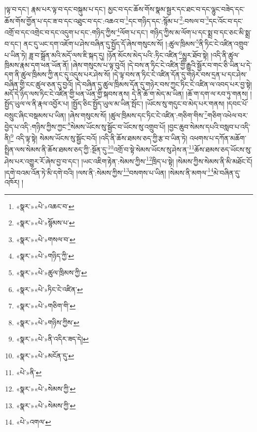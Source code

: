 །ལྟ་བ་དང་། རྣམ་པར་ལྟ་བ་དང་བསྐུམ་པ་དང་། མྱང་བ་དང་ཆོས་གོས་སྣམ་སྦྱར་དང་ཐང་བ་དང་ལྷུང་བཟེད་དང་ཆོས་གོས་གྱོན་པ་དང་ཟ་བ་དང་འཐུང་བ་དང་:འཆའ་བ་\footnote{«སྣར་»«པེ་»འཆང་བ་}དང་གཉིད་དང་:སྙོམ་པ་\footnote{«སྣར་»«པེ་»སྙོམས་པ་}:བསལ་བ་\footnote{«སྣར་»«པེ་»གསལ་བ་}དང་འོང་བ་དང་འགྲོ་བ་དང་འགྲེང་བ་དང་འདུག་པ་དང་:གཉིད་ཀྱིས་\footnote{«སྣར་»«པེ་»གཉིད་ཀྱི་}ལོག་པ་དང་། གཉིད་ཀྱིས་མ་ལོག་པ་དང་སྨྲ་བ་དང་ཅང་མི་སྨྲ་བ་དང་། ནང་དུ་ཡང་དག་འཇོག་པ་ཤེས་བཞིན་དུ་སྤྱོད་དོ་ཞེས་གསུངས་སོ། །:ཚུལ་ཁྲིམས་\footnote{«སྣར་»«པེ་»ཚུལ་ཁྲིམས་ཀྱི་}ནི་ཏིང་ངེ་འཛིན་འགྲུབ་པ་ཡིན་ཏེ། ཟླ་བ་སྒྲོན་མའི་མདོ་ལས་ཇི་སྐད་དུ། །ཉོན་མོངས་མེད་པའི་:ཏིང་འཛིན་\footnote{«སྣར་»«པེ་»ཏིང་ངེ་འཛིན་}མྱུར་ཐོབ་སྟེ། །འདི་ནི་ཚུལ་ཁྲིམས་རྣམ་དག་ཕན་ཡོན་ནོ། །ཞེས་གསུངས་པ་ལྟ་བུའོ། །དེ་བས་ན་ཏིང་ངེ་འཛིན་གྱི་རྒྱུའི་སྦྱོར་བ་གང་ཅི་ཡིན་པ་དེ་དག་ནི་ཚུལ་ཁྲིམས་ཀྱི་ནང་དུ་འདུས་པར་ཤེས་སོ། །དེ་ལྟ་བས་ན་ཏིང་ངེ་འཛིན་དོན་དུ་གཉེར་བས་དྲན་པ་དང་ཤེས་བཞིན་གྱི་ངང་ཚུལ་ཅན་དུ་བྱའོ། །དེ་བཞིན་དུ་ཚུལ་ཁྲིམས་དོན་དུ་གཉེར་བས་ཀྱང་ཏིང་ངེ་འཛིན་ལ་འབད་པར་བྱ་སྟེ། མདོ་དེ་ཉིད་ལས་ཏིང་ངེ་འཛིན་གྱི་ཕན་ཡོན་གྱི་སྐབས་ནས། དེ་ནི་ཆོ་ག་མེད་མ་ཡིན། །ཆོ་ག་དག་ལ་རབ་ཏུ་གནས། །སྤྱོད་ཡུལ་ལ་ནི་རྣལ་འབྱོར་པ། །སྤྱོད་ཅིང་སྤྱོད་ཡུལ་མ་ཡིན་སྤོང་། །ཡོངས་སུ་གདུང་བ་མེད་པར་གནས། །དབང་པོ་བསྲུང་ཞིང་བསྡམས་པ་ཡིན། །ཞེས་གསུངས་སོ། །ཚུལ་ཁྲིམས་དང་ཏིང་ངེ་འཛིན་:གཅིག་གིས་\footnote{«སྣར་»«པེ་»གཅིག་གི་}གཅིག་འཕེལ་བར་བྱེད་པ་འདི་:གཉིས་ཀྱིས་ཀྱང་\footnote{«སྣར་»«པེ་»གཉིས་ཀྱིས་}སེམས་ཡོངས་སུ་སྦྱོང་བ་ཡོངས་སུ་འགྲུབ་པོ། །བྱང་ཆུབ་སེམས་དཔའི་བསླབ་པ་འདི་ནི།\footnote{«སྣར་»«པེ་»ནི་འདིར་ཟད་དེ།} འདི་ལྟ་སྟེ། སེམས་ཡོངས་སུ་སྦྱོང་བའོ། །འདི་ནི་ཆོས་ཐམས་ཅད་ཀྱི་རྩ་བ་ཡིན་ཏེ། འཕགས་པ་དཀོན་མཆོག་སྤྲིན་ལས་སེམས་ནི་ཆོས་ཐམས་ཅད་ཀྱི་:སྔོན་དུ་\footnote{«སྣར་»«པེ་»མངོན་དུ་}འགྲོ་བ་སྟེ་སེམས་ཡོངས་སུ་ཤེས་ན་\footnote{«པེ་»ནི་}ཆོས་ཐམས་ཅད་ཡོངས་སུ་ཤེས་པར་འགྱུར་རོ་ཞེས་བྱ་བ་དང་། །ཡང་འཇིག་རྟེན་:སེམས་ཀྱིས་\footnote{«སྣར་»«པེ་»སེམས་ཀྱི་}ཁྲིད་པ་སྟེ། །སེམས་ཀྱིས་སེམས་ནི་མི་མཐོང་ངོ། །དགེ་བའམ་འོན་ཏེ་མི་དགེ་བའི། །ལས་ནི་:སེམས་ཀྱིས་\footnote{«སྣར་»«པེ་»སེམས་ཀྱི་}བསགས་པ་ཡིན། །སེམས་ནི་མགལ་\footnote{«པེ་»འགལ་}མེ་བཞིན་དུ་འཁོར། །
